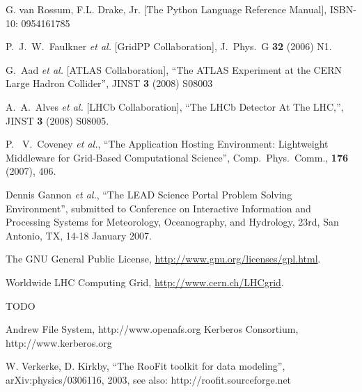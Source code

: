 \documentclass{elsart}
\begin{document}
\begin{thebibliography}{00}

 G. van Rossum, F.L. Drake, Jr. [The Python Language Reference Manual], ISBN-10: 0954161785

  P.~J.~W.~Faulkner {\it et al.}  [GridPP Collaboration],
  J.\ Phys.\ G {\bf 32} (2006) N1.

G.~Aad {\it et al.}  [ATLAS Collaboration], ``The ATLAS Experiment at the CERN Large Hadron Collider'',
JINST {\bf 3} (2008) S08003



 A.~A.~Alves {\it et al.}  [LHCb Collaboration], ``The LHCb Detector At The LHC,'', 
JINST {\bf 3} (2008) S08005.


  P.~ V.~Coveney {\it et al.}, ``The Application Hosting Environment:
  Lightweight Middleware for Grid-Based Computational Science'',
  Comp.~Phys.~Comm., {\bf 176} (2007), 406.

  Dennis Gannon {\it et al.}, ``The LEAD Science Portal Problem Solving
  Environment'', submitted to Conference on Interactive Information and
  Processing Systems for Meteorology, Oceanography, and Hydrology, 23rd, San
  Antonio, TX, 14-18 January 2007.

  The GNU General Public License,
  \url{http://www.gnu.org/licenses/gpl.html}.

Worldwide LHC Computing Grid, \url{http://www.cern.ch/LHCgrid}.

 TODO

 Andrew File System, http://www.openafs.org
 Kerberos Consortium, http://www.kerberos.org

 W. Verkerke, D. Kirkby, ``The RooFit toolkit for data modeling'',
arXiv:physics/0306116, 2003, see also: http://roofit.sourceforge.net


\end{thebibliography}
\end{document}
